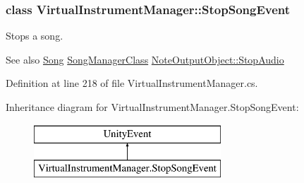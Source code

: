 \subsubsection{class Virtual\+Instrument\+Manager\+:\+:Stop\+Song\+Event}
Stops a song. 

\begin{DoxySeeAlso}{See also}
\hyperlink{class_song}{Song} \hyperlink{class_song_manager_class}{Song\+Manager\+Class} \hyperlink{group___n_o_o_pub_func_gae8a8e5bc027fd0186464a68399a4fecb}{Note\+Output\+Object\+::\+Stop\+Audio} 
\end{DoxySeeAlso}


Definition at line 218 of file Virtual\+Instrument\+Manager.\+cs.

Inheritance diagram for Virtual\+Instrument\+Manager.\+Stop\+Song\+Event\+:\begin{figure}[H]
\begin{center}
\leavevmode
\includegraphics[height=2.000000cm]{group___v_i_m_event_types}
\end{center}
\end{figure}
